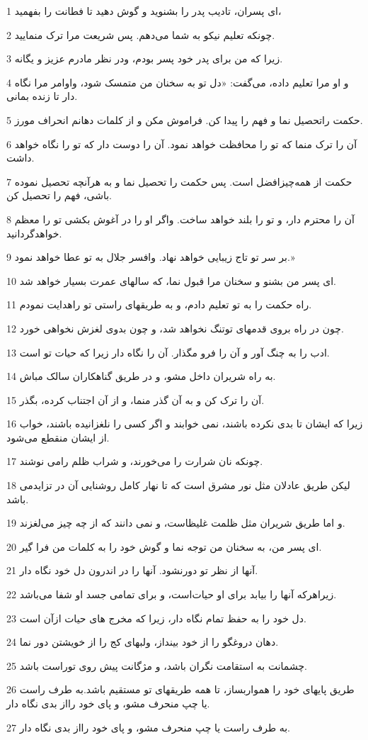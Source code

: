 \par 1 ای پسران، تادیب پدر را بشنوید و گوش دهید تا فطانت را بفهمید،
\par 2 چونکه تعلیم نیکو به شما می‌دهم. پس شریعت مرا ترک منمایید.
\par 3 زیرا که من برای پدر خود پسر بودم، ودر نظر مادرم عزیز و یگانه.
\par 4 و او مرا تعلیم داده، می‌گفت: «دل تو به سخنان من متمسک شود، واوامر مرا نگاه دار تا زنده بمانی.
\par 5 حکمت راتحصیل نما و فهم را پیدا کن. فراموش مکن و از کلمات دهانم انحراف مورز.
\par 6 آن را ترک منما که تو را محافظت خواهد نمود. آن را دوست دار که تو را نگاه خواهد داشت.
\par 7 حکمت از همه‌چیزافضل است. پس حکمت را تحصیل نما و به هرآنچه تحصیل نموده باشی، فهم را تحصیل کن.
\par 8 آن را محترم دار، و تو را بلند خواهد ساخت. واگر او را در آغوش بکشی تو را معظم خواهدگردانید.
\par 9 بر سر تو تاج زیبایی خواهد نهاد. وافسر جلال به تو عطا خواهد نمود.»
\par 10 ‌ای پسر من بشنو و سخنان مرا قبول نما، که سالهای عمرت بسیار خواهد شد.
\par 11 راه حکمت را به تو تعلیم دادم، و به طریقهای راستی تو راهدایت نمودم.
\par 12 چون در راه بروی قدمهای توتنگ نخواهد شد، و چون بدوی لغزش نخواهی خورد.
\par 13 ادب را به چنگ آور و آن را فرو مگذار. آن را نگاه دار زیرا که حیات تو است.
\par 14 به راه شریران داخل مشو، و در طریق گناهکاران سالک مباش.
\par 15 آن را ترک کن و به آن گذر منما، و از آن اجتناب کرده، بگذر.
\par 16 زیرا که ایشان تا بدی نکرده باشند، نمی خوابند و اگر کسی را نلغزانیده باشند، خواب از ایشان منقطع می‌شود.
\par 17 چونکه نان شرارت را می‌خورند، و شراب ظلم رامی نوشند.
\par 18 لیکن طریق عادلان مثل نور مشرق است که تا نهار کامل روشنایی آن در تزایدمی باشد.
\par 19 و اما طریق شریران مثل ظلمت غلیظاست، و نمی دانند که از چه چیز می‌لغزند.
\par 20 ‌ای پسر من، به سخنان من توجه نما و گوش خود را به کلمات من فرا گیر.
\par 21 آنها از نظر تو دورنشود. آنها را در اندرون دل خود نگاه دار.
\par 22 زیراهر‌که آنها را بیابد برای او حیات‌است، و برای تمامی جسد او شفا می‌باشد.
\par 23 دل خود را به حفظ تمام نگاه دار، زیرا که مخرج های حیات ازآن است.
\par 24 دهان دروغگو را از خود بینداز، ولبهای کج را از خویشتن دور نما.
\par 25 چشمانت به استقامت نگران باشد، و مژگانت پیش روی توراست باشد.
\par 26 طریق پایهای خود را همواربساز، تا همه طریقهای تو مستقیم باشد.به طرف راست یا چپ منحرف مشو، و پای خود رااز بدی نگاه دار.
\par 27 به طرف راست یا چپ منحرف مشو، و پای خود رااز بدی نگاه دار.
 
